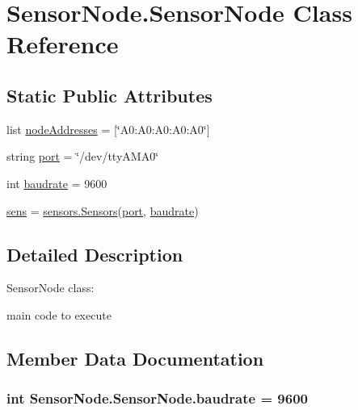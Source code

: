 \hypertarget{classSensorNode_1_1SensorNode}{}\section{Sensor\+Node.\+Sensor\+Node Class Reference}
\label{classSensorNode_1_1SensorNode}
\subsection*{Static Public Attributes}
\begin{DoxyCompactItemize}
\item 
list \hyperlink{classSensorNode_1_1SensorNode_a17be4a277b9bfdd041ec006b462d497c}{node\+Addresses} = \mbox{[}\char`\"{}A0\+:\+A0\+:\+A0\+:\+A0\+:\+A0\char`\"{}\mbox{]}
\item 
string \hyperlink{classSensorNode_1_1SensorNode_a94712cd1b0bf09fa4cd3de94ca666575}{port} = \char`\"{}/dev/tty\+A\+M\+A0\char`\"{}
\item 
int \hyperlink{classSensorNode_1_1SensorNode_a68f7a87f1d03a2734f3f6505f801a92e}{baudrate} = 9600
\item 
\hyperlink{classSensorNode_1_1SensorNode_ad8aec254c15c97a8b5c709480f31b2bb}{sens} = \hyperlink{classsensors_1_1Sensors}{sensors.\+Sensors}(\hyperlink{classSensorNode_1_1SensorNode_a94712cd1b0bf09fa4cd3de94ca666575}{port}, \hyperlink{classSensorNode_1_1SensorNode_a68f7a87f1d03a2734f3f6505f801a92e}{baudrate})
\end{DoxyCompactItemize}


\subsection{Detailed Description}
\begin{DoxyVerb}SensorNode class:

    main code to execute\end{DoxyVerb}
 

\subsection{Member Data Documentation}
\subsubsection[{\texorpdfstring{baudrate}{baudrate}}]{\setlength{\rightskip}{0pt plus 5cm}int Sensor\+Node.\+Sensor\+Node.\+baudrate = 9600\hspace{0.3cm}{\ttfamily [static]}}\hypertarget{classSensorNode_1_1SensorNode_a68f7a87f1d03a2734f3f6505f801a92e}{}\label{classSensorNode_1_1SensorNode_a68f7a87f1d03a2734f3f6505f801a92e}
